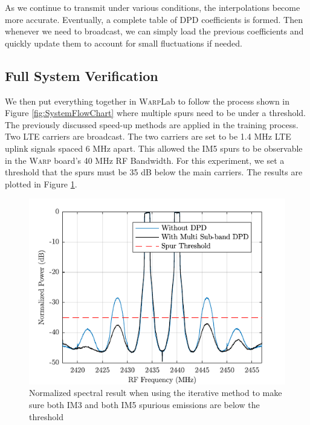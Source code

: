 As we continue to transmit under various conditions, the interpolations become more accurate. Eventually, a complete table of DPD coefficients is formed. Then whenever we need to broadcast, we can simply load the previous coefficients and quickly update them to account for small fluctuations if needed. 

\subsection{Full System Verification}
We then put everything together in \textsc{Warp}Lab to follow the process shown in Figure \ref{fig:SystemFlowChart} where multiple spurs need to be under a threshold. The previously discussed speed-up methods are applied in the training process. Two LTE carriers are broadcast. The two carriers are set to be 1.4 MHz LTE uplink signals spaced 6 MHz apart. This allowed the IM5 spurs to be observable in the \textsc{Warp} board's 40 MHz RF Bandwidth. For this experiment, we set a threshold that the spurs must be 35 dB below the main carriers. The results are plotted in Figure \ref{fig:IM5}.

\begin{figure}
	\centering
	\includegraphics[]{IM5Spectrum}
	\caption{Normalized spectral result when using the iterative method to make sure both IM3 and both IM5 spurious emissions are below the threshold}
	\label{fig:IM5}
\end{figure}


